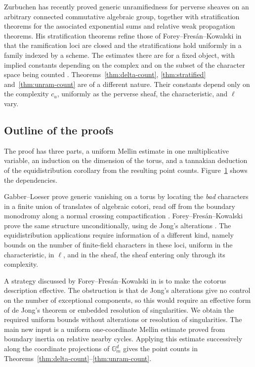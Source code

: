 \documentclass[12pt,reqno]{amsart}
\theoremstyle{definition}
\theoremstyle{plain}
\theoremstyle{definition}
\theoremstyle{remark}
\newcommand{\bbG}{\mathbb{G}}  \newcommand{\bbH}{\mathbb{H}}
\newcommand{\Gm}{\bbG_m}
\newcommand{\cu}{c_u}
\begin{document}
Zurbuchen \cite{Zurbuchen2026} has recently proved generic unramifiedness for perverse sheaves on an
arbitrary connected commutative algebraic group, together with stratification theorems for the
associated exponential sums and relative weak propagation theorems.  His stratification theorems refine
those of Forey--Fres\'an--Kowalski in that the ramification loci are closed and the stratifications hold
uniformly in a family indexed by a scheme.  The estimates there are for a fixed object, with implied
constants depending on the complex and on the subset of the character space being counted
\cite[Prop.~2.84]{Zurbuchen2026}.  Theorems~\ref{thm:delta-count}, \ref{thm:stratified}
and~\ref{thm:unram-count} are of a different nature.  Their constants depend only on the complexity
\(\cu\), uniformly as the perverse sheaf, the characteristic, and \(\ell\) vary.

\subsection{Outline of the proofs}
\label{sec:outline}

The proof has three parts, a uniform Mellin estimate in one multiplicative variable, an induction on
the dimension of the torus, and a tannakian deduction of the equidistribution corollary from the
resulting point counts.  Figure~\ref{fig:leitfaden} shows the dependencies.

\begin{figure}[omitted: a diagram of this paper's results, not reproduced here]\label{fig:leitfaden}\end{figure}

Gabber--Loeser prove generic vanishing on a torus by locating the \emph{bad} characters in a finite
union of translates of algebraic cotori, read off from the boundary monodromy along a normal crossing
compactification \cite[Th.~4.1.1']{GabberLoeser1996}.  Forey--Fres\'an--Kowalski prove the same
structure unconditionally, using de Jong's alterations
\cite[Th.~2.12, Prop.~2.13]{ForeyFresanKowalski2021}.  The equidistribution applications require information
of a different kind, namely bounds on the number of finite-field characters in these loci, uniform in
the characteristic, in \(\ell\), and in the sheaf, the sheaf entering only through its complexity.

A strategy discussed by Forey--Fres\'an--Kowalski in \cite[Rem.~2.4]{ForeyFresanKowalski2021} is to make the
cotorus description effective.  The obstruction is that de Jong's alterations give no control on the
number of exceptional components, so this would require an effective form of de Jong's theorem or
embedded resolution of singularities.  We obtain the required uniform bounds without alterations or
resolution of singularities.  The main new input is a uniform one-coordinate Mellin estimate proved
from boundary inertia on relative nearby cycles.  Applying this estimate successively along the
coordinate projections of \(\Gm^d\) gives the point counts in
Theorems~\ref{thm:delta-count}--\ref{thm:unram-count}.
\end{document}
